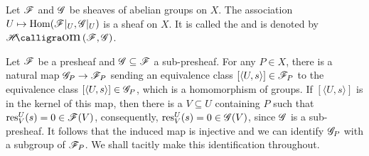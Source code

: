 \begin{definition}
    Let $\mathscr{F}$ and $\mathscr{G}$ be sheaves of abelian groups on $X$. The association $U\mapsto\operatorname{Hom}(\mathscr{F}|_U, \mathscr{G}|_U)$ is a sheaf on $X$. It is called the  and is denoted by $\sheafHom(\scrF, \scrG)$.
\end{definition}

\setcounter{exercise}{1}

\begin{remark}
    Let $\mathscr{F}$ be a presheaf and $\mathscr{G}\subseteq\mathscr{F}$ a sub-presheaf. For any $P\in X$, there is a natural map $\mathscr{G}_P\to\mathscr{F}_P$ sending an equivalence class $[\langle U, s\rangle]\in\mathscr{F}_P$ to the equivalence class $[\langle U, s\rangle]\in\mathscr{G}_P$, which is a homomorphism of groups. If $[\langle U, s\rangle]$ is in the kernel of this map, then there is a $V\subseteq U$ containing $P$ such that $\operatorname{res}^U_V(s) = 0\in\mathscr{F}(V)$, consequently, $\operatorname{res}^U_V(s) = 0\in\mathscr{G}(V)$, since $\mathscr{G}$ is a sub-presheaf. It follows that the induced map is injective and we can identify $\mathscr{G}_P$ with a subgroup of $\mathscr{F}_P$. We shall tacitly make this identification throughout.
\end{remark}

